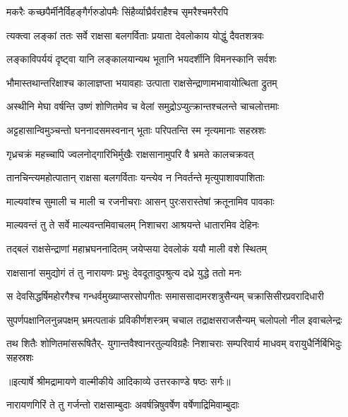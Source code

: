 \twolineshloka
{मकरैः कच्छपैर्मीनैर्विहङ्गैर्गरुडोपमैः}
{सिंहैर्व्याघ्रैर्वराहैश्च सृमरैश्चमरैरपि} %

\twolineshloka
{त्यक्त्वा लङ्कां ततः सर्वे राक्षसा बलगर्विताः}
{प्रयाता देवलोकाय योद्धुं दैवतशत्रवः} %

\twolineshloka
{लङ्काविपर्ययं दृष्ट्वा यानि लङ्कालयान्यथ}
{भूतानि भयदर्शीनि विमनस्कानि सर्वशः} %

\twolineshloka
{भौमास्तथान्तरिक्षाश्च कालाज्ञप्ता भयावहाः}
{उत्पाता राक्षसेन्द्राणामभावायोत्थिता द्रुतम्} %

\twolineshloka
{अस्थीनि मेघा वर्षन्ति उष्णं शोणितमेव च}
{वेलां समुद्रोऽप्युत्क्रान्तश्चलन्ते चाचलोत्तमाः} %

\twolineshloka
{अट्टहासान्विमुञ्चन्तो घननादसमस्वनान्}
{भूताः परिपतन्ति स्म नृत्यमानाः सहस्रशः} %

\twolineshloka
{गृध्रचक्रं महच्चापि ज्वलनोद्गारिभिर्मुखैः}
{राक्षसानामुपरि वै भ्रमते कालचक्रवत्} %

\twolineshloka
{तानचिन्त्यमहोत्पातान् राक्षसा बलगर्विताः}
{यन्त्येव न निवर्तन्ते मृत्युपाशावपाशिताः} %

\twolineshloka
{माल्यवांश्च सुमाली च माली च रजनीचराः}
{आसन् पुरःसरास्तेषां क्रतूनामिव पावकाः} %

\twolineshloka
{माल्यवन्तं तु ते सर्वे माल्यवन्तमिवाचलम्}
{निशाचरा आश्रयन्ते धातारमिव देहिनः} %

\twolineshloka
{तद्बलं राक्षसेन्द्राणां महाभ्रघननादितम्}
{जयेप्सया देवलोकं ययौ माली वशे स्थितम्} %

\twolineshloka
{राक्षसानां समुद्योगं तं तु नारायणः प्रभुः}
{देवदूतादुपश्रुत्य दध्रे युद्धे ततो मनः} %

\fourlineindentedshloka
{स देवसिद्धर्षिमहोरगैश्च}
{गन्धर्वमुख्याप्सरसोपगीतः}
{समाससादामरशत्रुसैन्यम्}
{चक्रासिसीरप्रवरादिधारी} %

\fourlineindentedshloka
{सुपर्णपक्षानिलनुन्नपक्षम्}
{भ्रमत्पताकं प्रविकीर्णशस्त्रम्}
{चचाल तद्राक्षसराजसैन्यम्}
{चलोपलो नील इवाचलेन्द्रः} %

\fourlineindentedshloka
{तथ शितैः शोणितमांसरूषितैर्-}
{युगान्तवैश्वानरतुल्यविग्रहैः}
{निशाचराः सम्परिवार्य माधवम्}
{वरायुधैर्निर्बिभिदुः सहस्रशः} %


{॥इत्यार्षे श्रीमद्रामायणे वाल्मीकीये आदिकाव्ये उत्तरकाण्डे षष्ठः सर्गः॥}


\twolineshloka
{नारायणगिरिं ते तु गर्जन्तो राक्षसाम्बुदाः}
{अवर्षन्निषुवर्षेण वर्षेणाद्रिमिवाम्बुदाः} %

